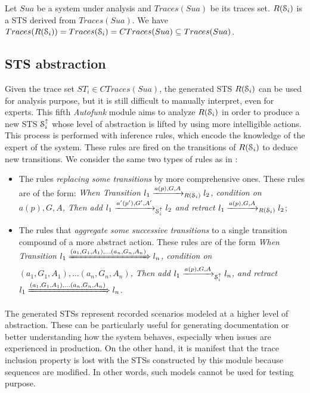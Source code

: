 \begin{proposition}
  Let $\mathit{Sua}$ be a system under analysis and $Traces(Sua)$ be its traces
  set. $R(\EuScript{S}_i)$ is a STS derived from $Traces(Sua)$.
  We have $Traces(R(\EuScript{S}_i)) = Traces(\EuScript{S}_i) =
  CTraces(Sua) \subseteq Traces(Sua)$.
\end{proposition}

\subsection{STS abstraction}

Given the trace set $ST_i \in CTraces(Sua)$, the generated STS
$R(\EuScript{S}_i)$ can be used for analysis purpose, but it is still
difficult to manually interpret, even for experts.  This fifth
\textit{Autofunk} module aims to analyze $R(\EuScript{S}_i)$ in
order to produce a new STS $\EuScript{S}_i^\uparrow$ whose level
of abstraction is lifted by using more intelligible actions. This
process is performed with inference rules, which encode the
knowledge of the expert of the system. These rules are fired on
the transitions of $R(\EuScript{S}_i)$ to deduce new transitions.
We consider the same two types of rules as in
:

\begin{itemize}
    \item The rules \emph{replacing some transitions} by more
    comprehensive ones. These rules are of the form: \textit{When
    Transition $l_1 \xrightarrow{a(p),G,A}_{R(\EuScript{S}_i)}
    l_2$, condition on $a(p),G,A$, Then add $l_1
    \xrightarrow{a'(p'),G',A'}_{\EuScript{S}_i^\uparrow} l_2$ and
    retract $l_1 \xrightarrow{a(p),G,A}_{R(\EuScript{S}_i)}
    l_2$};

    \item The rules that \emph{aggregate some successive transitions}
    to a single transition compound of a more abstract action.
    These rules are of the form \textit{When Transition $l_1
    \xRightarrow{(a_1,G_1,A_1),...(a_n,G_n,A_n)} l_n$, condition
    on $(a_1,G_1,A_1),...(a_n,G_n,A_n)$, Then add $l_1
    \xrightarrow{a(p),G,A}_{\EuScript{S}_i^\uparrow} l_n $, and
    retract $l_1 \xRightarrow{(a_1,G_1,A_1),...(a_n,G_n,A_n)} l_n$}.
\end{itemize}

The generated STSs represent recorded scenarios modeled at a
higher level of abstraction. These can be particularly useful for
generating documentation or better understanding how the system
behaves, especially when issues are experienced in production.
On the other hand, it is manifest that the trace inclusion
property is lost with the STSs constructed by this module because
sequences are modified. In other words, such models cannot be
used for testing purpose.


